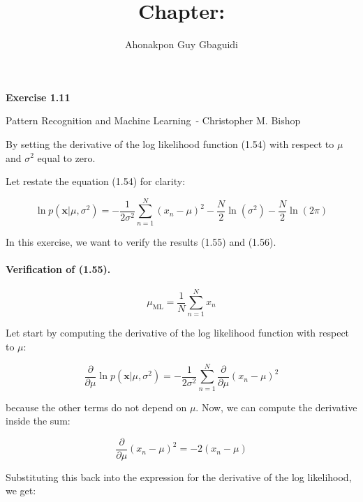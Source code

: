 \documentclass{article}
\title{Chapter: \ChapterName}
\author{Ahonakpon Guy Gbaguidi}
\date{}
\newcommand{\BookName}{Pattern Recognition and Machine Learning}
\newcommand{\BookAuthor}{Christopher M. Bishop}
\newcommand{\ExerciseID}{1.11}
\begin{document}
\maketitle

\begin{center}
  \large\textbf{Exercise \ExerciseID}

  \vspace{0.5em}

  \normalsize\BookName\ - \BookAuthor
\end{center}

\begin{tcolorbox}[breakable,colback=gray!5,colframe=gray!60,title=Solution]
By setting the derivative of the log likelihood function (1.54) with respect to 
\(\mu\) and \(\sigma^2\) equal to zero.

Let restate the equation (1.54) for clarity:

\begin{equation}
  \ln p(\mathbf{x}|\mu,\sigma^2) = - \frac{1}{2\sigma^2}\sum_{n=1}^N (x_n - \mu)^2 -\frac{N}{2}\ln(\sigma^2) - \frac{N}{2}\ln(2\pi) \tag{1.54}
\end{equation}

In this exercise, we want to verify the results (1.55) and (1.56).

\paragraph{Verification of (1.55).}

\begin{equation}
  \mu_{\text{ML}} = \frac{1}{N} \sum_{n=1}^N x_n \tag{1.55}
\end{equation}

Let start by computing the derivative of the log likelihood function with respect to \(\mu\):

\begin{equation}
  \frac{\partial}{\partial \mu} \ln p(\mathbf{x}|\mu,\sigma^2) = -\frac{1}{2\sigma^2} \sum_{n=1}^N \frac{\partial}{\partial \mu} (x_n - \mu)^2
\end{equation}

because the other terms do not depend on \(\mu\). Now, we can compute the derivative inside the sum:

\begin{equation}
  \frac{\partial}{\partial \mu} (x_n - \mu)^2 = -2(x_n - \mu)
\end{equation}

Substituting this back into the expression for the derivative of the log likelihood, we get:


\end{tcolorbox}
\end{document}
